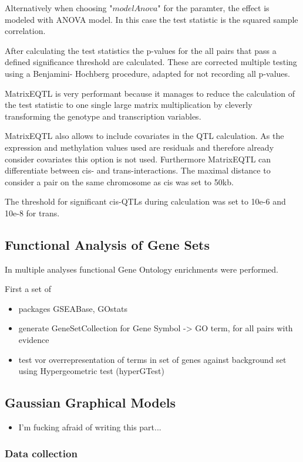 \documentclass[a4paper,12pt]{article}
\begin{document}
Alternatively when choosing "$modelAnova$" for the paramter, the effect is modeled with ANOVA model. In this case the test statistic is the squared sample correlation.

After calculating the test statistics the p-values for the all pairs that pass a defined significance threshold are calculated. These are corrected multiple testing using a Benjamini- Hochberg procedure, adapted for not recording all p-values.

MatrixEQTL is very performant because it manages to reduce the calculation of the test statistic to one single large matrix multiplication by cleverly transforming the genotype and transcription variables.

MatrixEQTL also allows to include covariates in the QTL calculation. As the expression and methylation values used are residuals and therefore already consider covariates this option is not used. Furthermore MatrixEQTL can differentiate between cis- and trans-interactions. The maximal distance to consider a pair on the same chromosome as cis was set to 50kb. 

The threshold for significant cis-QTLs during calculation was set to 10e-6 and 10e-8 for trans.

\subsection{Functional Analysis of Gene Sets}
In multiple analyses functional Gene Ontology enrichments were performed.

First a set of 
\begin{itemize}
\item packages GSEABase, GOstats
\item generate GeneSetCollection for Gene Symbol -> GO term, for all pairs with evidence
\item test vor overrepresentation of terms in set of genes against background set using Hypergeometric test (hyperGTest)
\end{itemize}
\subsection{Gaussian Graphical Models}
\begin{itemize}
\item I'm fucking afraid of writing this part...
\end{itemize}

\subsubsection{Data collection}
\end{document}
